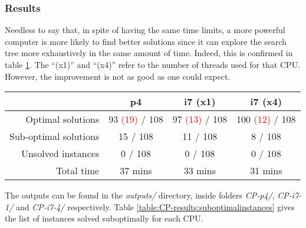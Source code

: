 \subsubsection{Results}
\label{sec:benchmarking:constraint-programming:results}

Needless to say that, in spite of having the same time limits, a more powerful computer
is more likely to find better solutions since it can explore the search tree more exhaustively
in the same amount of time. Indeed, this is confirmed in table \ref{table:CP-results}.
The ``(x1)'' and ``(x4)'' refer to the number of threads used for that CPU. However,
the improvement is not as good as one could expect.

\begin{table}[H]
\centering
	\begin{tabular}{rccc}
								& p4			& i7 (x1)	& i7 (x4) \\
		\midrule
		Optimal solutions		& 93 \textcolor{red}{(19)} / 108
											& 97 \textcolor{red}{(13)} / 108
														& 100 \textcolor{red}{(12)} / 108 \\
		Sub-optimal solutions	& 15 / 108	& 11 / 108	&   8 / 108 \\
		Unsolved instances		&  0 / 108	&  0 / 108	&   0 / 108 \\
		Total time				& 37 mins	& 33 mins	& 31 mins \\
	\end{tabular}
	\label{table:CP-results}
\end{table}

The outputs can be found in the \textit{outputs/} directory, inside folders
\textit{CP-p4/}, \textit{CP-i7-1/} and \textit{CP-i7-4/} respectively.
Table \ref{table:CP-results:suboptimalinstances} gives the list of instances
solved suboptimally for each CPU.

